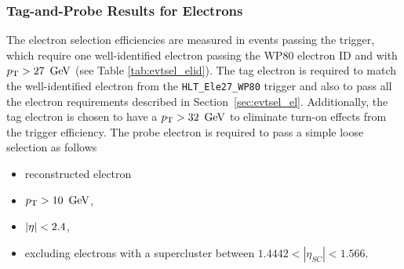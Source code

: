 \subsubsection{Tag-and-Probe Results for Electrons}
\label {sec:eff_tnp_el}
The electron selection efficiencies are measured in events passing the
trigger, which require one well-identified electron passing the WP80
electron ID and with $p_{\mathrm{T}}>27\ \,\text{Ge\hspace{-.08em}V}$ (see Table \ref{tab:evtsel_elid}). The
tag electron is required to match the well-identified electron from the
\verb=HLT_Ele27_WP80= trigger and also to pass all the electron requirements
described in Section~\ref{sec:evtsel_el}. Additionally, the tag electron is
chosen to have a $\pt>32\ \GeV$ to eliminate turn-on effects from the trigger
efficiency. The probe electron is required to pass a simple loose selection as
follows

\begin{itemize}
\item reconstructed electron
\item $p_{\mathrm{T}} > 10\ \,\text{Ge\hspace{-.08em}V}$,
\item $\left|\eta\right| < 2.4$, 
\item excluding electrons with a supercluster between $1.4442 < |\eta_{SC}| < 1.566$.
\end{itemize}

